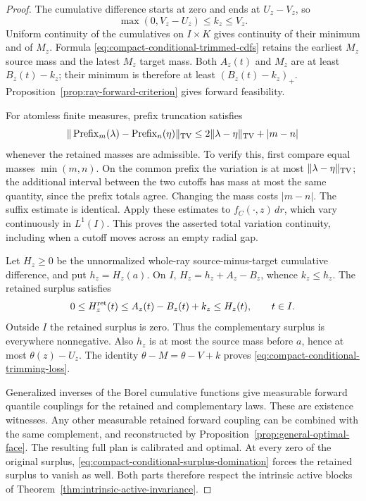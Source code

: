 \documentclass[11pt,reqno]{amsart}
\theoremstyle{definition}
\theoremstyle{remark}
\numberwithin{equation}{section}
\begin{document}
\begin{proof}
The cumulative difference starts at zero and ends at \(U_z-V_z\),
so
\[
 \max(0,V_z-U_z)\le k_z\le V_z.
\]
Uniform continuity of the cumulatives on \(I\times K\) gives
continuity of their minimum and of \(M_z\). Formula
\eqref{eq:compact-conditional-trimmed-cdfs} retains the earliest
\(M_z\) source mass and the latest \(M_z\) target mass. Both
\(A_z(t)\) and \(M_z\) are at least \(B_z(t)-k_z\);
their minimum is therefore at least \((B_z(t)-k_z)_+\).
Proposition~\ref{prop:ray-forward-criterion} gives forward feasibility.

For atomless finite measures, prefix truncation satisfies
\[
 \|\operatorname{Prefix}_m(\lambda)
          -\operatorname{Prefix}_n(\eta)\|_{\rm TV}
       \le 2\|\lambda-\eta\|_{\rm TV}+|m-n|
\]
whenever the retained masses are admissible. To verify this, first
compare equal masses \(\min(m,n)\). On the common prefix the
variation is at most \(\|\lambda-\eta\|_{\rm TV}\); the
additional interval between the two cutoffs has mass at most the
same quantity, since the prefix totals agree. Changing the mass
costs \(|m-n|\). The suffix estimate is identical. Apply these
estimates to \(f_C(\cdot,z)\,dr\), which vary continuously in
\(L^1(I)\). This proves the asserted total variation continuity,
including when a cutoff moves across an empty radial gap.

Let \(H_z\ge0\) be the unnormalized whole-ray source-minus-target
cumulative difference, and put \(h_z=H_z(a)\). On \(I\),
\(H_z=h_z+A_z-B_z\), whence \(k_z\le h_z\). The retained surplus
satisfies
\begin{equation}
\label{eq:compact-conditional-surplus-domination}
 0\le H_z^{\rm ret}(t)
   \le A_z(t)-B_z(t)+k_z\le H_z(t),\qquad t\in I.
\end{equation}
Outside \(I\) the retained surplus is zero. Thus the complementary
surplus is everywhere nonnegative. Also \(h_z\) is at most the
source mass before \(a\), hence at most \(\theta(z)-U_z\).
The identity \(\theta-M=\theta-V+k\) proves
\eqref{eq:compact-conditional-trimming-loss}.

Generalized inverses of the Borel cumulative functions give measurable
forward quantile couplings for the retained and complementary laws.
These are existence witnesses. Any other measurable retained forward
coupling can be combined with the same complement, and reconstructed
by Proposition~\ref{prop:general-optimal-face}. The resulting full
plan is calibrated and optimal. At every zero of the original surplus,
\eqref{eq:compact-conditional-surplus-domination} forces the retained
surplus to vanish as well. Both parts therefore respect the intrinsic
active blocks of Theorem~\ref{thm:intrinsic-active-invariance}.
\end{proof}
\end{document}
